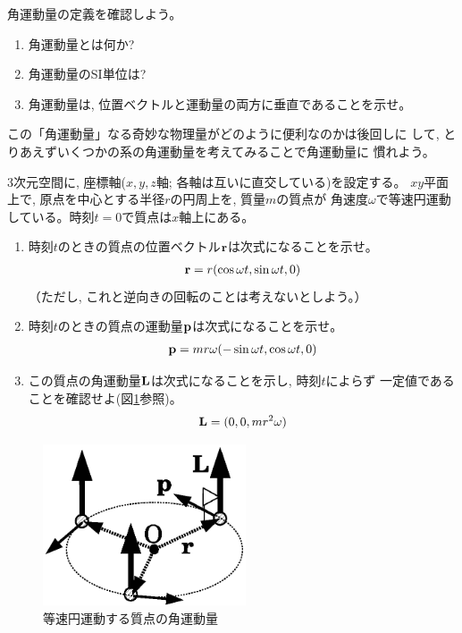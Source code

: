%
\begin{q}\label{q:angular_momentum} 角運動量の定義を確認しよう。
\begin{enumerate} 
\item 角運動量とは何か?
\item 角運動量のSI単位は?
\item 角運動量は, 位置ベクトルと運動量の両方に垂直であることを示せ。
\end{enumerate}
\end{q}
\vspace{0.2cm}

この「角運動量」なる奇妙な物理量がどのように便利なのかは後回しに
して, とりあえずいくつかの系の角運動量を考えてみることで角運動量に
慣れよう。\mv

%
\begin{q}\label{q:circle_angularmom}
3次元空間に, 座標軸($x,y,z$軸; 各軸は互いに直交している)を設定する。
$xy$平面上で, 原点を中心とする半径$r$の円周上を, 質量$m$の質点が
角速度$\omega$で等速円運動している。時刻$t=0$で質点は$x$軸上にある。
\begin{enumerate}
\item 時刻$t$のときの質点の位置ベクトル${\bf r}$は次式になることを示せ。
\begin{eqnarray}
{\bf r}=r(\cos \omega t, \sin \omega t, 0)\label{eq:circle_angularmom1}
\end{eqnarray}
（ただし, これと逆向きの回転のことは考えないとしよう。）
\item 時刻$t$のときの質点の運動量${\bf p}$は次式になることを示せ。
\begin{eqnarray}
{\bf p}=mr\omega(-\sin \omega t, \cos \omega t, 0)\label{eq:circle_angularmom2}
\end{eqnarray}
\item この質点の角運動量${\bf L}$は次式になることを示し, 時刻$t$によらず
一定値であることを確認せよ(図\ref{fig:angular_mom_circ}参照)。
\begin{eqnarray}
{\bf L}=(0, 0, mr^2\omega)\label{eq:circle_angularmom3}
\end{eqnarray}
\end{enumerate}
\begin{figure}[h]
    \centering
    \includegraphics[width=6cm]{angular_mom_circ.eps}
    \caption{等速円運動する質点の角運動量}\label{fig:angular_mom_circ}
\end{figure}\end{q}

